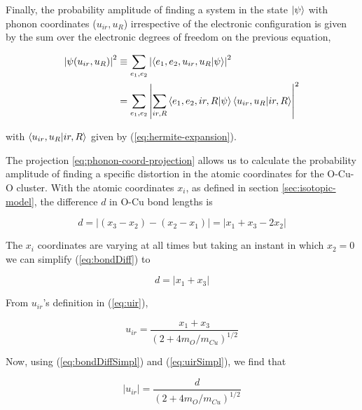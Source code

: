 Finally, the probability amplitude of finding a system in the state $\left | \psi \right\rangle$ with phonon coordinates ($u_{ir},u_R$) irrespective of the electronic configuration is given by the sum over the electronic degrees of freedom on the previous equation,

\begin{equation}
  \label{eq:phonon-coord-projection}
  \begin{split}
    \left|\psi(u_{ir}, u_R)\right|^2 & \equiv \sum_{e_1,e_2}\left|\left\langle e_1,e_2,u_{ir},u_R|\psi\right\rangle\right|^2 \\
    & = \sum_{e_1,e_2} \left|\sum_{ir,R}\left\langle e_1,e_2,ir,R|\psi\right\rangle\left\langle u_{ir},u_R|ir,R\right\rangle\right|^2
  \end{split}
\end{equation}

\noindent with $\left\langle u_{ir},u_R|ir,R\right\rangle$ given by (\ref{eq:hermite-expansion}).

The projection \ref{eq:phonon-coord-projection} allows us to calculate the probability amplitude of finding a specific distortion in the atomic coordinates for the O-Cu-O cluster.
With the atomic coordinates $x_i$, as defined in section \ref{sec:isotopic-model}, the difference $d$ in O-Cu bond lengths is

\begin{equation}
  \label{eq:bondDiff}
  d= \left| (x_3 - x_2) - (x_2 - x_1) \right| = \left| x_1 + x_3 - 2x_2 \right|
\end{equation}

The $x_i$ coordinates are varying at all times but taking an instant in which $x_2=0$ we can simplify (\ref{eq:bondDiff}) to

\begin{equation}
  \label{eq:bondDiffSimpl}
  d=\left|x_1+x_3\right|
\end{equation}

From $u_{ir}$'s definition in (\ref{eq:uir}),

\begin{equation}
  \label{eq:uirSimpl}
  u_{ir}=\frac{x_1+x_3}{\left( 2+4 m_O/m_{Cu} \right)^{1/2}}
\end{equation}

Now, using (\ref{eq:bondDiffSimpl}) and (\ref{eq:uirSimpl}), we find that

\begin{equation}
  \label{eq:uirvsd}
  \left|u_{ir}\right|=\frac{d}{\left( 2+4 m_O/m_{Cu} \right)^{1/2}}
\end{equation}

